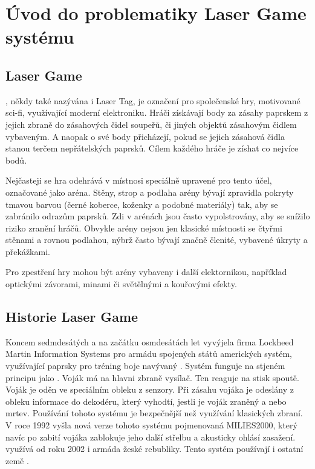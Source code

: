 \section{Úvod do problematiky Laser Game systému}

\subsection{Laser Game}
, někdy také nazývána i Laser Tag, je označení pro společenské hry, motivované sci-fi, využívající moderní elektroniku. Hráči získávají body za zásahy  paprskem z jejich zbraně do zásahových čidel soupeřů, či jiných objektů zásahovým čidlem vybaveným. A naopak o své body přicházejí, pokud se jejich zásahová čidla stanou terčem nepřátelských  paprsků. Cílem každého hráče je zíshat co nejvíce bodů.

Nejčasteji se hra odehrává v místnosi speciálně upravené pro tento účel, označované jako aréna. Stěny, strop a podlaha arény bývají zpravidla pokryty tmavou barvou (černé koberce, koženky a podobné materiály) tak, aby se zabránilo odrazům  paprsků. Zdi v arénách jsou často vypolstrovány, aby se snížilo riziko zranění hráčů. Obvykle arény nejsou jen klasické místnosti se čtyřmi stěnami a rovnou podlahou, nýbrž často bývají značně členité, vybavené úkryty a překážkami.

Pro zpestření hry mohou být arény vybaveny i další elektornikou, například optickými závorami, minami či světělnými a kouřovými efekty.



\subsection{Historie Laser Game}
Koncem sedmdesátých a na začátku osmdesátách let vyvýjela firma Lockheed Martin Information Systems pro armádu spojených států amerických systém, využívající  paprsky pro tréning boje navývaný . Systém funguje na stjeném principu jako . Voják má na hlavni zbraně  vysílač. Ten reaguje na stisk spoutě. Voják je oděn ve speciálním obleku z  senzory. Při zásahu vojáka je odeslány z obleku informace do dekodéru, který vyhodtí, jestli je voják zraněný a nebo mrtev. Používání tohoto systému je bezpečnější než využívání klasických zbraní. V roce 1992 vyšla nová verze tohoto systému pojmenovaná MILIES2000, který navíc po zabití vojáka zablokuje jeho další střelbu a akusticky ohlásí zasažení.  využívá od roku 2002 i armáda žeské rebubliky. Tento systém používají i ostatní země .


